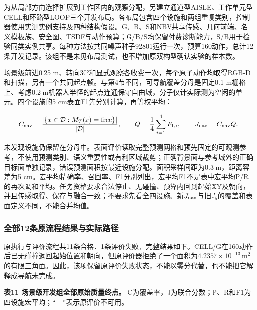 \documentclass[11pt,a4paper]{article}
\numberwithin{equation}{section}
\begin{document}
为从局部方向选择扩展到工作区内的观察分配，另建立通道型AISLE、工作单元型CELL和环路型LOOP三个开发布局。各布局包含四个设施和两组重复类别，控制器使用实测实例支持及四种结构假设。G、B、S和NBV共享传感、几何前端、名义模板族、安全图、TSDF与动作预算；G/B/S均保留付费诊断能力，S/B用于检验同类实例共享。每种方法按共同噪声种子92801运行一次，预算160动作，总计12条开发记录。该组不是未见布局测试，也不增加原双构型确认实验的样本数。

场景级前进0.25 m、转向30°和显式观察各收费一次，每个原子动作均取得RGB-D和扫描，另有一个共同起点帧。与第4节不同，可导航覆盖分母是固定0.1 m栅格上、考虑0.2 m机器人半径的起点连通保守自由域，分子仅计实际测为空闲的单元。四个设施的5 cm表面F1先分别计算，再等权平均：

\begin{equation}
C_{\rm nav}=\frac{|\{x\in\mathcal D:M_T(x)=\mathrm{free}\}|}{|\mathcal D|},\qquad
Q=\frac14\sum_{i=1}^{4}F_{1,i},\qquad J_{\rm nav}=C_{\rm nav}Q.
\end{equation}

未发现设施仍保留在分母中。表面评价读取完整预测网格和预先固定的可观测参考，不使用预测类别、语义重要性或有利区域裁剪；正确背景面与参考域外的正确目标面单独记录，错误预测面积按最近设施分配。面积采样间距为0.3 m，距离容差为5 cm。宏平均精确率、召回率、F1分别列出，宏平均F1不是表中宏平均P/R的再次调和平均。任务资格要求合法停止、无碰撞、预算内回到起始XY及朝向，并且传感取得、保存与融合一致；不要求先看全四设施。新\(J_{\rm nav}\)与旧\(J_5\)的覆盖和表面定义不同，不能合并均值。

\hypertarget{ux5168ux90e812ux6761ux539fux6d41ux7a0bux7ed3ux679cux4e0eux5b9eux9645ux8defux5f84}{%
\subsubsection{全部12条原流程结果与实际路径}\label{ux5168ux90e812ux6761ux539fux6d41ux7a0bux7ed3ux679cux4e0eux5b9eux9645ux8defux5f84}}

原执行与评价流程共11条合格、1条评价失败，完整结果如下。CELL/G在160动作后已无碰撞返回起始位置和朝向，但原评价器拒绝了一个面积为\(4.2357\times10^{-13}\,\mathrm{m}^2\)的有限三角面。因此，该项保留原评价失败状态，不能以零分代替，也不能把它解释成导航未完成。

\textbf{表11 场景级开发组全部原始质量终点。} C为覆盖率，J为联合分数；P、R和F1为四设施宏平均；``---''表示原评价不可用。
\end{document}
